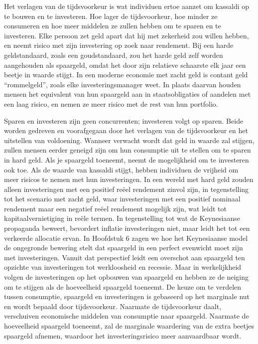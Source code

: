 Het verlagen van de tijdsvoorkeur is wat individuen ertoe aanzet om kassaldi op te bouwen en te investeren. Hoe lager de tijdsvoorkeur, hoe minder ze consumeren en hoe meer middelen ze zullen hebben om te sparen en te investeren. Elke persoon zet geld apart dat hij met zekerheid zou willen hebben, en neemt risico met zijn investering op zoek naar rendement. Bij een harde geldstandaard, zoals een goudstandaard, zou het harde geld zelf worden aangehouden als spaargeld, omdat het door zijn relatieve schaarste elk jaar een beetje in waarde stijgt. In een moderne economie met zacht geld is contant geld ``rommelgeld'', zoals elke investeringsmanager weet. In plaats daarvan houden mensen het equivalent van hun spaargeld aan in staatsobligaties of aandelen met een laag risico, en nemen ze meer risico met de rest van hun portfolio.

Sparen en investeren zijn geen concurrenten; investeren volgt op sparen. Beide worden gedreven en voorafgegaan door het verlagen van de tijdsvoorkeur en het uitstellen van voldoening. Wanneer verwacht wordt dat geld in waarde zal stijgen, zullen mensen eerder geneigd zijn om hun consumptie uit te stellen om te sparen in hard geld. Als je spaargeld toeneemt, neemt de mogelijkheid om te investeren ook toe. Als de waarde van kassaldi stijgt, hebben individuen de vrijheid om meer risico\textquotesingle s te nemen met hun investeringen. In een wereld met hard geld zouden alleen investeringen met een positief reëel rendement zinvol zijn, in tegenstelling tot het scenario met zacht geld, waar investeringen met een positief nominaal rendement maar een negatief reëel rendement mogelijk zijn, wat leidt tot kapitaalvernietiging in reële termen. In tegenstelling tot wat de Keynesiaanse propaganda beweert, bevordert inflatie investeringen niet, maar leidt het tot een verkeerde allocatie ervan. In Hoofdstuk 6 zagen we hoe het Keynesiaanse model de ongegronde bewering stelt dat spaargeld in een perfect evenwicht moet zijn met investeringen. Vanuit dat perspectief leidt een overschot aan spaargeld ten opzichte van investeringen tot werkloosheid en recessie. Maar in werkelijkheid volgen de investeringen op het opbouwen van spaargeld en hebben ze de neiging om te stijgen als de hoeveelheid spaargeld toeneemt. De keuze om te verdelen tussen consumptie, spaargeld en investeringen is gebaseerd op het marginale nut en wordt bepaald door tijdsvoorkeur. Naarmate de tijdsvoorkeur daalt, verschuiven economische middelen van consumptie naar spaargeld. Naarmate de hoeveelheid spaargeld toeneemt, zal de marginale waardering van de extra beetjes spaargeld afnemen, waardoor het investeringsrisico meer aanvaardbaar wordt.

